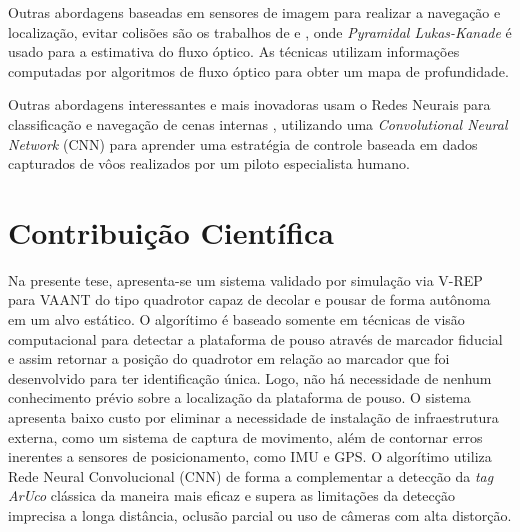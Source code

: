     Outras abordagens baseadas em sensores de imagem para realizar a navegação e localização, evitar colisões são os trabalhos de \citet{Zingg2010} e \citet{Lippiello2011}, onde \textit{Pyramidal Lukas-Kanade} é usado para a estimativa do fluxo óptico. As técnicas utilizam informações computadas por algoritmos de fluxo óptico para obter um mapa de profundidade.
    
    Outras abordagens interessantes e mais inovadoras usam o Redes Neurais para classificação e navegação de cenas internas \citet{Kim2015}, utilizando uma \textit{Convolutional Neural Network} (CNN) para aprender uma estratégia de controle baseada em dados capturados de vôos realizados por um piloto especialista humano.
    
    


\section{Contribuição Científica}
    
    Na presente tese, apresenta-se um sistema validado por simulação via V-REP para VAANT do tipo quadrotor capaz de decolar e pousar de forma autônoma em um alvo estático. O algorítimo é baseado somente em técnicas de visão computacional para detectar a plataforma de pouso através de marcador fiducial e assim retornar a posição do quadrotor em relação ao marcador que foi desenvolvido para ter identificação única. Logo, não há necessidade de nenhum conhecimento prévio sobre a localização da plataforma de pouso. O sistema apresenta baixo custo por eliminar a necessidade de instalação de infraestrutura externa, como um sistema de captura de movimento, além de contornar erros inerentes a sensores de posicionamento, como IMU e GPS. O algorítimo utiliza Rede Neural Convolucional (CNN) de forma a complementar a detecção da \textit{tag} \textit{ArUco} clássica da maneira mais eficaz e supera as limitações da detecção imprecisa a longa distância, oclusão parcial ou uso de câmeras com alta distorção.



